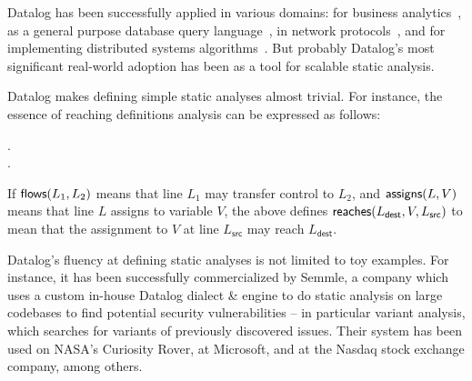 Datalog has been successfully applied in various domains: for business analytics~, as a general purpose database query language~, in network protocols~, and for implementing distributed systems algorithms~.
%
But probably Datalog's most significant real-world adoption has been as a tool for scalable static analysis.

Datalog makes defining simple static analyses almost trivial. For instance, the
essence of reaching definitions analysis can be expressed as follows:

\begin{datalog}
   \gets {}.
  \\
  \gets
  \neg{}
  \conj
  \conj
  .
\end{datalog}

\noindent
If $\text{\sffamily flows}({L_1, L_2})$ means that line $L_1$ may transfer control to $L_2$,
and $\text{\sffamily assigns}({L, V})$ means that line $L$ assigns to variable $V$, the
above defines $\text{\sffamily reaches}({L_{\textsf{dest}}, V, L_{\textsf{src}}})$
to mean that the assignment to $V$ at line $L_{\textsf{src}}$ may reach
$L_{\textsf{dest}}$. 

Datalog's fluency at defining static analyses is not limited to toy examples.
%
For instance, it has been successfully commercialized by Semmle, a company which
uses a custom in-house Datalog dialect \& engine  to do static
analysis on large codebases to find potential security vulnerabilities -- in
particular variant analysis, which searches for variants of previously
discovered issues.
%
Their system has been used on NASA's Curiosity Rover, at Microsoft, and at the
Nasdaq stock exchange company, among others.
%


